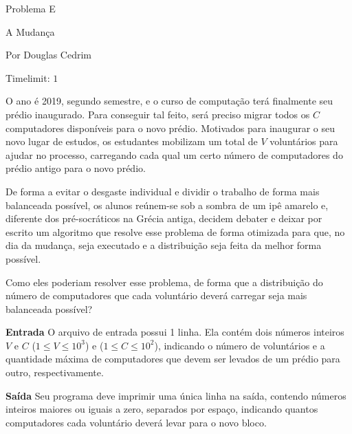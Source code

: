 \begin{center}
Problema E

A Mudança

{\tiny Por Douglas Cedrim}

Timelimit: $1$	
\end{center}			

O ano é 2019, segundo semestre, e o curso de computação terá finalmente seu prédio inaugurado. Para conseguir tal feito, será preciso migrar todos os $C$ computadores disponíveis para o novo prédio. Motivados para inaugurar o seu novo lugar de estudos, os estudantes mobilizam um total de $V$ voluntários para ajudar no processo, carregando cada qual um certo número de computadores do prédio antigo para o novo prédio.

De forma a evitar o desgaste individual e dividir o trabalho de forma mais balanceada possível, os alunos reúnem-se sob a sombra de um ipê amarelo e, diferente dos  pré-socráticos na Grécia antiga, decidem debater e deixar por escrito um algoritmo que resolve esse problema de forma otimizada para que, no dia da mudança, seja executado e a distribuição seja feita da melhor forma possível.

Como eles poderiam resolver esse problema, de forma que a distribuição do número de computadores que cada voluntário deverá carregar seja mais balanceada possível?

\vspace{0.3cm}
\textbf{Entrada}
O arquivo de entrada possui 1 linha. Ela contém dois números inteiros $V$ e $C$ ($1 \leq V \leq 10^{3}$) e ($1 \leq C \leq 10^2$), indicando o número de voluntários e a quantidade máxima de computadores que devem ser levados de um prédio para outro, respectivamente.

\vspace{0.3cm}
\textbf{Saída}
Seu programa deve imprimir uma única linha na saída, contendo números inteiros maiores ou iguais a zero, separados por espaço, indicando quantos computadores cada voluntário deverá levar para o novo bloco.

